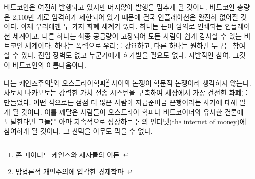 \begin{comment}
	While Bitcoin is still inflationary, it will cease to be so rather soon.
	The strictly limited supply of 21 million bitcoins will eventually do
	away with inflation completely. We now have two monetary worlds: an
	inflationary one where money is printed arbitrarily, and the world of
	Bitcoin, where final supply is fixed and easily auditable for everyone.
	One is forced upon us by violence, the other can be joined by anyone who
	wishes to do so. No barriers to entry, no one to ask for permission.
	Voluntary participation. That is the beauty of Bitcoin.
\end{comment}
비트코인은 여전히 발행되고 있지만 머지않아 발행을 멈추게 될 것이다. 
비트코인 총량은 2,100만 개로 엄격하게 제한되어 있기 때문에 결국 인플레이션은 완전히 없어질 것이다.
이제 우리에겐 두 가지 화폐 세계가 있다. 
하나는 돈이 임의로 인쇄되는 인플레이션 세계이고, 다른 하나는 최종 공급량이 고정되어 모든 사람이 쉽게 감사할 수 있는 비트코인 세계이다.
하나는 폭력으로 우리를 강요하고, 다른 하나는 원하면 누구든 참여할 수 있다.
진입 장벽도 없고 누군가에게 허가받을 필요도 없다. 
자발적인 참여. 그것이 비트코인의 아름다움이다.

\begin{comment}
	I would argue that the argument between Keynesian\footnote{Theories according to
		John Maynard Keynes and his deciples~\cite{wiki:keynesian}} and
	Austrian\footnote{School of economic thought based on methodological
		individualism~\cite{wiki:austrian}} economists is no longer purely academical.
	Satoshi managed to build a system for value transfer on steroids, creating the
	soundest money which ever existed in the process. One way or another, more and
	more people will learn about the scam which is fractional reserve banking. If
	they come to similar conclusions as most Austrians and Bitcoiners, they might
	join the ever-growing internet of money. Nobody can stop them if they choose to
	do so.
\end{comment}
나는 케인즈주의\footnote{존 메이너드 케인즈와 제자들의 이론~\cite{wiki:keynesian}}와 오스트리아학파\footnote{방법론적 개인주의에 입각한 경제학파~\cite{wiki:austrian}} 사이의 논쟁이 학문적 논쟁이라 생각하지 않는다. 
사토시 나카모토는 강력한 가치 전송 시스템을 구축하여 세상에서 가장 건전한 화폐를 만들었다. 
어떤 식으로든 점점 더 많은 사람이 지급준비금 은행이라는 사기에 대해 알게 될 것이다. 
이를 깨달은 사람들이 오스트리아 학파나 비트코이너와 유사한 결론에 도달한다면 
그들은 아마 지속적으로 성장하는 돈의 인터넷(the internet of money)에 참여하게 될 것이다. 
그 선택을 아무도 막을 수 없다.

